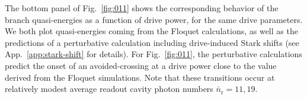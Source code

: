\documentclass[%
reprint,
superscriptaddress,
 amsmath,amssymb,
 aps,
 prx,
longbibliography,
floatfix,
]{revtex4-2}
\begin{document}
The bottom panel of Fig.~\ref{fig:011} shows the corresponding behavior of the branch quasi-energies as a function of drive power, for the same drive parameters.  We both plot quasi-energies coming from the Floquet calculations, as well as the predictions of a perturbative calculation including drive-induced Stark shifts (see App.~\ref{app:stark-shift} for details). For Fig.~\ref{fig:011}, the perturbative calculations predict the onset of an avoided-crossing at a drive power close to the value derived from the Floquet simulations.%
Note that these transitions occur at relatively modest average readout cavity photon numbers $\bar n_\textrm{r}=11,19$. 
\end{document}

